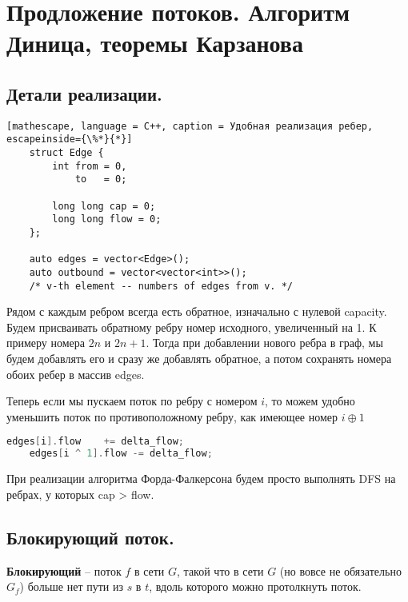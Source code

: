 \section{Продложение потоков. Алгоритм Диница, теоремы Карзанова}%
\label{sec:Продложение потоков. Алгоритм Диница, теоремы Карзанова}

\subsection{Детали реализации.}%
\label{sub:Детали реализации.}


\begin{lstlisting}[mathescape, language = C++, caption = Удобная реализация ребер, escapeinside={\%*}{*}] 
	struct Edge {
		int from = 0,
		    to   = 0;

		long long cap = 0;
		long long flow = 0;
	};

	auto edges = vector<Edge>();
	auto outbound = vector<vector<int>>(); 
	/* v-th element -- numbers of edges from v. */
\end{lstlisting}

Рядом с каждым ребром всегда есть обратное, изначально с нулевой capacity. Будем присваивать обратному ребру номер исходного, увеличенный на 1. К примеру номера $2n$ и $2n + 1$.
Тогда при добавлении нового ребра в граф, мы будем добавлять его и сразу же добавлять обратное, а потом сохранять номера обоих ребер в массив edges.

Теперь если мы пускаем поток по ребру с номером $i$, то можем удобно уменьшить поток по противоположному ребру, как имеющее номер $i \oplus 1$

\begin{lstlisting}[language = C++]
	edges[i].flow	 += delta_flow;
	edges[i ^ 1].flow -= delta_flow;
\end{lstlisting}
При реализации алгоритма Форда-Фалкерсона будем просто выполнять DFS на ребрах, у которых cap > flow.

\subsection{Блокирующий поток.}%

\begin{Def}
	\textbf{Блокирующий} --  поток $f$ в сети  $G$, такой что в сети  $G$ (но вовсе не обязательно $G_f$) больше нет пути из $s$ в  $t$, вдоль которого можно протолкнуть поток. 
\end{Def}

\newpage

